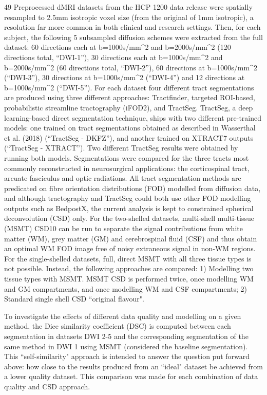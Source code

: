 49 Preprocessed dMRI datasets from the HCP 1200 data release were spatially resampled to 2.5mm isotropic voxel size (from the original of 1mm isotropic), a resolution far more common in both clinical and research settings.
Then, for each subject, the following 5 subsampled diffusion schemes were extracted from the full dataset:
60 directions each at b=1000s/mm^2 and b=2000s/mm^2 (120 directions total, ``DWI-1”), 30 directions each at b=1000s/mm^2 and b=2000s/mm^2 (60 directions total, ``DWI-2”), 60 directions at b=1000s/mm^2 (``DWI-3”), 30 directions at b=1000s/mm^2 (``DWI-4”) and 12 directions at b=1000s/mm^2 (``DWI-5”).
For each dataset four different tract segmentations are produced using three different approaches: Tractfinder, targeted ROI-based, probabilistic streamline tractography (iFOD2), and TractSeg.
TractSeg, a deep learning-based direct segmentation technique, ships with two different pre-trained models:
one trained on tract segmentations obtained as described in Wasserthal et al. (2018) (``TractSeg - DKFZ”), and another trained on XTRACT7 outputs (``TractSeg - XTRACT”).
Two different TractSeg results were obtained by running both models.
Segmentations were compared for the three tracts most commonly reconstructed in neurosurgical applications: the corticospinal tract, arcuate fasciculus and optic radiations.
All tract segmentation methods are predicated on fibre orientation distributions (FOD) modelled from diffusion data, and although tractography and TractSeg could both use other FOD modelling outputs such as BedpostX, the current analysis is kept to constrained spherical deconvolution (CSD) only.
For the two-shelled datasets, multi-shell multi-tissue (MSMT) CSD10 can be run to separate the signal contributions from white matter (WM), grey matter (GM) and cerebrospinal fluid (CSF) and thus obtain an optimal WM FOD image free of noisy extraneous signal in non-WM regions.
For the single-shelled datasets, full, direct MSMT with all three tissue types is not possible.
Instead, the following approaches are compared: 1) Modelling two tissue types with MSMT.
MSMT CSD is performed twice, once modelling WM and GM compartments, and once modelling WM and CSF compartments; 2) Standard single shell CSD ``original flavour".

To investigate the effects of different data quality and modelling on a given method, the Dice similarity coefficient (DSC) is computed between each segmentation in datasets DWI 2-5 and the corresponding segmentation of the same method in DWI 1 using MSMT (considered the baseline segmentation).
This ``self-similarity" approach is intended to answer the question put forward above: how close to the results produced from an ``ideal" dataset be achieved from a lower quality dataset.
This comparison was made for each combination of data quality and CSD approach.

